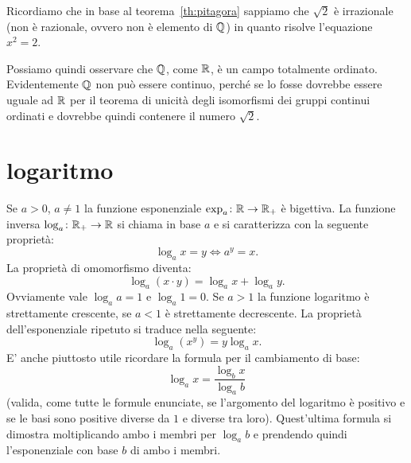 Ricordiamo che in base al teorema~\ref{th:pitagora} sappiamo 
che $\sqrt 2$ è irrazionale 
(non è razionale, ovvero non è elemento di ${\mathbb Q}$)
in quanto risolve l'equazione $x^2=2$.

Possiamo quindi osservare che ${\mathbb Q}$, come ${\mathbb R}$, è un campo totalmente 
ordinato.
Evidentemente ${\mathbb Q}$ non può essere continuo, perché se lo fosse 
dovrebbe essere uguale ad ${\mathbb R}$ per il teorema di unicità degli 
isomorfismi dei gruppi continui ordinati e dovrebbe quindi 
contenere il numero $\sqrt 2$. 

\section{logaritmo}
%
Se $a>0$, $a\neq 1$ la funzione esponenziale 
$\exp_a\colon {\mathbb R} \to {\mathbb R}_+$ è bigettiva. 
La funzione inversa $\log_a\colon {\mathbb R}_+\to {\mathbb R}$ si chiama  in base $a$ 
e si caratterizza con la seguente proprietà:
\[
  \log_a x = y \iff a^y = x.
\]
La proprietà di omomorfismo diventa:
\[
  \log_a(x\cdot y) =  \log_a x + \log_a y.
\]
Ovviamente vale $\log_a a = 1$ e $\log_a 1 = 0$.
Se $a>1$ la funzione logaritmo è strettamente crescente, se $a<1$ è strettamente decrescente.
La proprietà dell'esponenziale ripetuto si traduce nella seguente:
\[
  \log_a (x^y) = y \log_a x.
\]
E' anche piuttosto utile ricordare la formula per il cambiamento di base:
\[
\log_a x = \frac{\log_b x}{\log_a b}
\]
(valida, come tutte le formule enunciate, se l'argomento del logaritmo 
è positivo e se le basi sono positive diverse da $1$ e diverse tra loro).
Quest'ultima formula si dimostra moltiplicando ambo i membri per $\log_a b$ 
e prendendo quindi l'esponenziale con base $b$ di ambo i membri.


